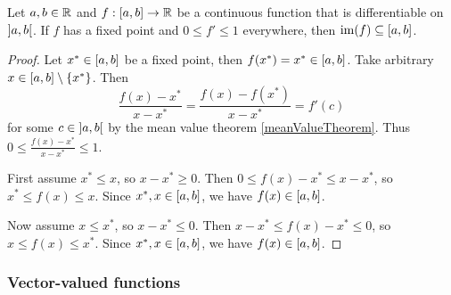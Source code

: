 \begin{lemma} \label{boundDerivativeAndFixedPointGivesRange}
Let $a,b\in \mathbb{R}$ and $f:\interval{a,b}\to \R$ be a continuous function that is differentiable on $\interval[o]{a,b}$. If $f$ has a fixed point and $0\leq f' \leq 1$ everywhere, then $\im(f)\subseteq \interval{a,b}$. 
\end{lemma}
\begin{proof}
Let $x^*\in \interval{a,b}$ be a fixed point, then $f(x^*) = x^* \in \interval{a,b}$. Take arbitrary $x\in \interval{a,b}\setminus\{x^*\}$. Then
\[ \frac{f(x) - x^*}{x - x^*} = \frac{f(x) - f(x^*)}{x - x^*} = f'(c) \]
for some $c\in \interval[o]{a,b}$ by the mean value theorem \ref{meanValueTheorem}. Thus $0\leq \frac{f(x) - x^*}{x - x^*} \leq 1$.

First assume $x^* \leq x$, so $x - x^* \geq 0$. Then $0 \leq f(x) - x^* \leq x - x^*$, so $x^* \leq f(x) \leq x$. Since $x^*, x\in \interval{a,b}$, we have $f(x)\in \interval{a,b}$.

Now assume $x\leq x^*$, so $x - x^* \leq 0$. Then $x - x^* \leq f(x) - x^* \leq 0$, so $x \leq f(x) \leq x^*$. Since $x^*, x\in \interval{a,b}$, we have $f(x)\in \interval{a,b}$.
\end{proof}

\subsubsection{Vector-valued functions}

